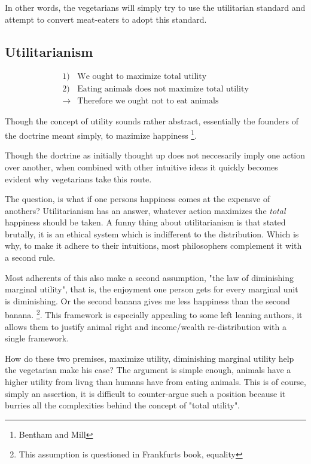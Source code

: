 \documentclass[12pt]{report}
\numberwithin{equation}{section}
\begin{document}
In other words, the vegetarians will simply try to use the utilitarian standard and attempt to convert meat-eaters to adopt this standard. 

\subsection{Utilitarianism} 


\begin{mdframed}[style=MyFrame]
\begin{align*}
1)& \text{We ought to maximize total utility} \\
2)& \text{Eating animals does not maximize total utility} \\
\rightarrow& \text{Therefore we ought not to eat animals}
\end{align*}
\end{mdframed}

Though the concept of utility sounds rather abstract, essentially the founders of the doctrine meant simply, to mazimize happiness \footnote{Bentham and Mill}. 

Though the doctrine as initially thought up does not neccesarily imply one action over another, when combined with other intuitive ideas it quickly becomes evident why vegetarians take this route. 

The question, is what if one persons happiness comes at the expensve of anothers? Utilitarianism has an answer, whatever action maximizes the \textit{total} happiness should be taken. A funny thing about utilitarianism is that stated brutally, it is an ethical system which is indifferent to the distribution. Which is why, to make it adhere to their intuitions, most philosophers complement it with a second rule. 

Most adherents of this also make a second assumption, "the law of diminishing marginal utility", that is, the enjoyment one person gets for every marginal unit is diminishing. Or the second banana gives me less happiness than the second banana. \footnote{This assumption is questioned in Frankfurts book, equality}. This framework is especially appealing to some left leaning authors, it allows them to justify animal right and income/wealth re-distribution with a single framework. 

How do these two premises, maximize utility, diminishing marginal utility help the vegetarian make his case? The argument is simple enough, animals have a higher utility from livng than humans have from eating animals. This is of course, simply an assertion, it is difficult to counter-argue such a position because it burries all the complexities behind the concept of "total utility". 
\end{document}
